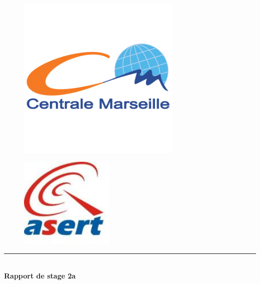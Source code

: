 \begin{titlepage}
\begin{center}

\begin{figure}[ht]
  \begin{minipage}[b]{0.5\linewidth}
    \centering
    \includegraphics[width=0.7\textwidth]{img/logo_ecm}
    \label{logo_ecm}
  \end{minipage}
  \hspace{0.5cm}
  \begin{minipage}[t]{0.5\linewidth}
    \vspace{-4cm}
    \begin{center}
    \includegraphics[width=0.4\textwidth]{img/logo_asert}
    \end{center}
    \label{logo_asert}
  \end{minipage}
\end{figure}



\vspace{2cm}
\hrule  ~\\[0.4cm]
{ \huge \bfseries Rapport de stage 2a}\\[0.4cm]


\end{center}
\end{titlepage}
